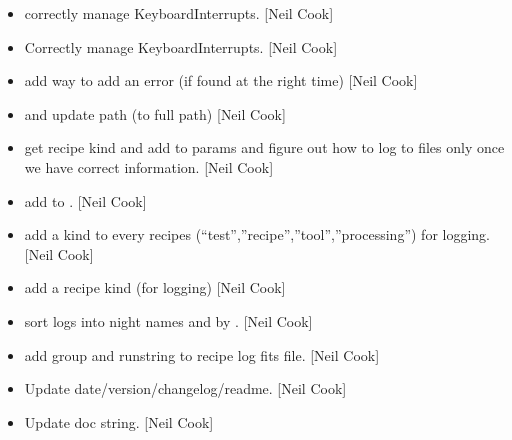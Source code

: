 \documentclass[a4paper,10pt,english]{report}
\begin{document}
\begin{itemize}
\item {} 
 \sphinxhyphen{} correctly manage KeyboardInterrupts. {[}Neil
Cook{]}

\item {} 
Correctly manage KeyboardInterrupts. {[}Neil Cook{]}

\item {} 
 \sphinxhyphen{} add way to add an error (if found at the right
time) {[}Neil Cook{]}

\item {} 
 and  \sphinxhyphen{} update
 path (to full path) {[}Neil Cook{]}

\item {} 
 \sphinxhyphen{} get recipe kind and add to params and
figure out how to log to files only once we have correct information.
{[}Neil Cook{]}

\item {} 
 \sphinxhyphen{} add  to . {[}Neil Cook{]}

\item {} 
 \sphinxhyphen{} add a kind to every recipes
(“test”,”recipe”,”tool”,”processing”) for logging. {[}Neil Cook{]}

\item {} 
 \sphinxhyphen{} add a recipe kind (for logging) {[}Neil Cook{]}

\item {} 
 \sphinxhyphen{} sort logs into night names and by .
{[}Neil Cook{]}

\item {} 
 \sphinxhyphen{} add group and runstring to recipe log fits
file. {[}Neil Cook{]}

\item {} 
Update date/version/changelog/readme. {[}Neil Cook{]}

\item {} 
Update doc string. {[}Neil Cook{]}

\end{itemize}
\end{document}
